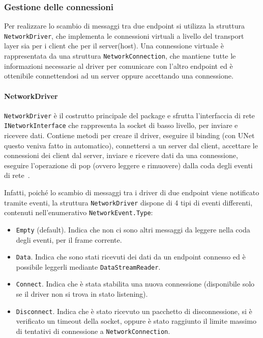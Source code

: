 \subsubsection{Gestione delle connessioni}
Per realizzare lo scambio di messaggi tra due endpoint si utilizza la struttura \verb|NetworkDriver|, che implementa le connessioni virtuali a livello del transport layer sia per i client che per il server(host).
Una connessione virtuale è rappresentata da una struttura \verb|NetworkConnection|, che mantiene tutte le informazioni necessarie al driver per comunicare con l'altro endpoint ed è ottenibile connettendosi ad un server oppure accettando una connessione.

\paragraph{NetworkDriver}
\verb|NetworkDriver| è il costrutto principale del package e sfrutta l'interfaccia di rete \verb|INetworkInterface| che rappresenta la socket di basso livello, per inviare e ricevere dati. Contiene metodi per creare il driver, eseguire il binding (con UNet questo veniva fatto in automatico), connettersi a un server dal client, accettare le connessioni dei client dal server, inviare e ricevere dati da una connessione, eseguire l'operazione di pop (ovvero leggere e rimuovere) dalla coda degli eventi di rete~\cite{doc:unity-transport-api}.

Infatti, poiché lo scambio di messaggi tra i driver di due endpoint viene notificato tramite eventi, la struttura \verb|NetworkDriver| dispone di 4 tipi di eventi differenti, contenuti nell'enumerativo \verb|NetworkEvent.Type|:
\begin{itemize}
    \item \verb|Empty| (default). Indica che non ci sono altri messaggi da leggere nella coda degli eventi, per il frame corrente.
    \item \verb|Data|. Indica che sono stati ricevuti dei dati da un endpoint connesso ed è possibile leggerli mediante \verb|DataStreamReader|.
    \item \verb|Connect|. Indica che è stata stabilita una nuova connessione (disponibile solo se il driver non si trova in stato listening).
    \item \verb|Disconnect|. Indica che è stato ricevuto un pacchetto di disconnessione, si è verificato un timeout della socket, oppure è stato raggiunto il limite massimo di tentativi di connessione a \verb|NetworkConnection|.
\end{itemize}

